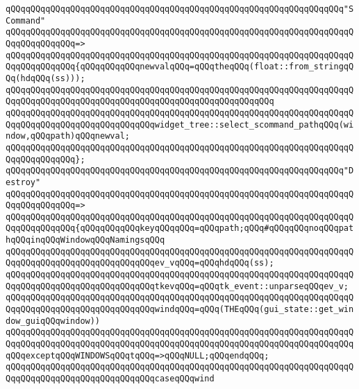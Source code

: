\newline
\verb|qQQqqQQqqQQqqQQqqQQqqQQqqQQqqQQqqQQqqQQqqQQqqQQqqQQqqQQqqQQqqQQqqQQq"SCommand"|\newline
\verb|qQQqqQQqqQQqqQQqqQQqqQQqqQQqqQQqqQQqqQQqqQQqqQQqqQQqqQQqqQQqqQQqqQQqqQQqqQQqqQQqqQQq=>|\newline
\verb|qQQqqQQqqQQqqQQqqQQqqQQqqQQqqQQqqQQqqQQqqQQqqQQqqQQqqQQqqQQqqQQqqQQqqQQqqQQqqQQqqQQq{qQQqqQQqqQQqnewvalqQQq=qQQqtheqQQq(float::from_stringqQQq(hdqQQq(ss)));|\newline
\verb|qQQqqQQqqQQqqQQqqQQqqQQqqQQqqQQqqQQqqQQqqQQqqQQqqQQqqQQqqQQqqQQqqQQqqQQqqQQqqQQqqQQqqQQqqQQqqQQqqQQqqQQqqQQqqQQqqQQqqQQqqQQq|\newline
\verb|qQQqqQQqqQQqqQQqqQQqqQQqqQQqqQQqqQQqqQQqqQQqqQQqqQQqqQQqqQQqqQQqqQQqqQQqqQQqqQQqqQQqqQQqqQQqqQQqqQQqwidget_tree::select_scommand_pathqQQq(window,qQQqpath)qQQqnewval;|\newline
\verb|qQQqqQQqqQQqqQQqqQQqqQQqqQQqqQQqqQQqqQQqqQQqqQQqqQQqqQQqqQQqqQQqqQQqqQQqqQQqqQQqqQQq};|\newline
\newline
\verb|qQQqqQQqqQQqqQQqqQQqqQQqqQQqqQQqqQQqqQQqqQQqqQQqqQQqqQQqqQQqqQQqqQQq"Destroy"|\newline
\verb|qQQqqQQqqQQqqQQqqQQqqQQqqQQqqQQqqQQqqQQqqQQqqQQqqQQqqQQqqQQqqQQqqQQqqQQqqQQqqQQqqQQq=>|\newline
\verb|qQQqqQQqqQQqqQQqqQQqqQQqqQQqqQQqqQQqqQQqqQQqqQQqqQQqqQQqqQQqqQQqqQQqqQQqqQQqqQQqqQQq{qQQqqQQqqQQqkeyqQQqqQQq=qQQqpath;qQQq#qQQqqQQqnoqQQqpathqQQqinqQQqWindowqQQqNamingsqQQq|\newline
\verb|qQQqqQQqqQQqqQQqqQQqqQQqqQQqqQQqqQQqqQQqqQQqqQQqqQQqqQQqqQQqqQQqqQQqqQQqqQQqqQQqqQQqqQQqqQQqqQQqqQQqev_vqQQq=qQQqhdqQQq(ss);|\newline
\verb|qQQqqQQqqQQqqQQqqQQqqQQqqQQqqQQqqQQqqQQqqQQqqQQqqQQqqQQqqQQqqQQqqQQqqQQqqQQqqQQqqQQqqQQqqQQqqQQqqQQqtkevqQQq=qQQqtk_event::unparseqQQqev_v;|\newline
\verb|qQQqqQQqqQQqqQQqqQQqqQQqqQQqqQQqqQQqqQQqqQQqqQQqqQQqqQQqqQQqqQQqqQQqqQQqqQQqqQQqqQQqqQQqqQQqqQQqqQQqwindqQQq=qQQq(THEqQQq(gui_state::get_window_guiqQQqwindow))|\newline
\verb|qQQqqQQqqQQqqQQqqQQqqQQqqQQqqQQqqQQqqQQqqQQqqQQqqQQqqQQqqQQqqQQqqQQqqQQqqQQqqQQqqQQqqQQqqQQqqQQqqQQqqQQqqQQqqQQqqQQqqQQqqQQqqQQqqQQqqQQqqQQqqQQqexceptqQQqWINDOWSqQQqtqQQq=>qQQqNULL;qQQqendqQQq;|\newline
\newline
\verb|qQQqqQQqqQQqqQQqqQQqqQQqqQQqqQQqqQQqqQQqqQQqqQQqqQQqqQQqqQQqqQQqqQQqqQQqqQQqqQQqqQQqqQQqqQQqqQQqqQQqcaseqQQqwind|\newline
